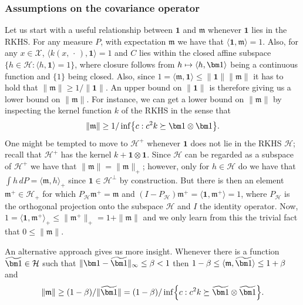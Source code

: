 \documentclass[AHL,Unicode,longabstracts,published]{cedram}
\theoremstyle{remark}
\newcommand{\X}{\mathcal{X}}
\newcommand{\cH}{\mathcal{H}}
\newcommand{\mean}{\mathfrak{m}}
\let\oldtilde\tilde
\renewcommand*{\tilde}[1]{\mathchoice{\widetilde{#1}}{\widetilde{#1}}{\oldtilde{#1}}{\oldtilde{#1}}}
\let\oldmapsto\mapsto
\renewcommand*{\mapsto}{\mathchoice{\longmapsto}{\oldmapsto}{\oldmapsto}{\oldmapsto}}
\let\originalleft\left
\let\originalright\right
\renewcommand{\left}{\mathopen{}\mathclose\bgroup\originalleft}
\renewcommand{\right}{\aftergroup\egroup\originalright}
\begin{document}
\subsubsection{Assumptions on the covariance operator} \label{sec:cov_centered}
Let us start with a useful relationship between $\bm 1$ and $\mean$ whenever $\bm 1$ lies in the RKHS. For any measure $P$, with expectation $\mean$ we have that $\langle \bm 1, \mean \rangle = 1$. Also, for any $x\in \X$, $\langle k(x,\,\cdot\,), \bm 1 \rangle = 1$ and $C$ lies within the closed affine subspace $\{h \in \cH : \langle h,\bm 1 \rangle =1 \}$, where closure follows from $h \mapsto \langle h, \bm 1\rangle$ being a continuous function and $\{1\}$ being closed. Also, since $1 = \langle \mean, \bm 1 \rangle \leq \|\bm 1\| \|\mean\|$ it has to hold that $\|\mean\| \geq 1/\|\bm 1\|$. An upper bound on $\| \bm 1 \|$ is therefore giving us a lower bound on $\| \mean\|$. For instance, we can get a lower bound on $\| \mean \|$ by inspecting the kernel function $k$ of the RKHS in the sense that
\begin{equation}
\|\mean\| \geq 1/ \inf\left\{ c: c^2 k \succeq \bm 1 \otimes \bm 1\right\}.
\end{equation}
One might be tempted to move to $\cH^+$ whenever $\bm 1$ does not lie in the RKHS $\cH$; recall that $\cH^+$ has the kernel $k + \bm 1 \otimes \bm 1$. Since $\cH$ can be regarded as a subspace of $\cH^+$ we have that $\|\mean\| = \|\mean\|_+$; however, only for $h\in \cH$ do we have that $\int h \, dP = \langle \mean, h \rangle_+$ since $\bm 1 \in \cH^\perp$ by construction. But there is then an element $\mean^+ \in \cH_+$ for which $P_\cH \mean^+ = \mean$ and $(I-P_\cH) \mean^+ = \langle \bm 1, \mean^+ \rangle = 1$, where $P_\cH$ is the orthogonal projection onto the subspace $\cH$ and $I$ the identity operator. Now, $1 = \langle \bm 1,\mean^+ \rangle_+ \leq \|\mean^+\|_+ = 1 + \|\mean\|$ and we only learn from this the trivial fact that $0 \leq \|\mean\|$.

An alternative approach gives us more insight. Whenever there is a function $\tilde{\bm 1} \in \cH$ such that $\|\bm 1 - \tilde{\bm 1}\|_\infty \leq \beta < 1$ then $ 1 - \beta \leq \langle \mean, \tilde{\bm 1} \rangle \leq 1+ \beta$ and
\begin{equation}
\| \mean \| \geq (1-\beta)/\|\tilde{\bm 1}\| = (1-\beta)/ \inf\left\{ c: c^2 k \succeq \tilde{\bm 1} \otimes \tilde{\bm 1}\right\}.
\end{equation}
\end{document}
